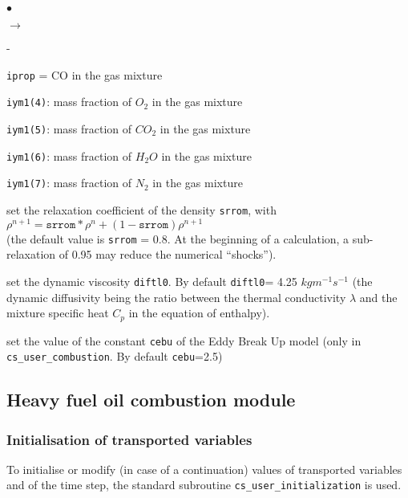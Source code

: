 {{{\begin{list}{$\bullet$}{}
\begin{list}{$\rightarrow$}{}
\begin{list}{}{}
\begin{list}{-}{}
\begin{list}{\texttt{iprop} = }{}
                            CO in the gas mixture
                      \item \texttt{iym1(4)}: mass fraction of
                            $O_2$ in the gas mixture
                      \item \texttt{iym1(5)}: mass fraction of
                            $CO_2$ in the gas mixture
                      \item \texttt{iym1(6)}: mass fraction of
                            $H_2O$ in the gas mixture
                      \item \texttt{iym1(7)}: mass fraction of
                            $N_2$ in the gas mixture
                     \end{list}
              \end{list}
             \end{list}
      \end{list}

 \item set the relaxation coefficient of the density \texttt{srrom}, with \\
$\rho^{n+1}=\texttt{srrom}*\rho^{n}+(1-\texttt{srrom})\rho^{n+1}$\\
(the default value is \texttt{srrom} = 0.8. At the
      beginning of a calculation, a sub-relaxation of 0.95 may reduce
      the numerical ``shocks'').

 \item set the dynamic viscosity \texttt{diftl0}. By default
      \texttt{diftl0}= 4.25 $kgm^{-1}s^{-1}$
(the dynamic diffusivity being the ratio between the thermal
      conductivity $\lambda$ and the mixture specific heat $C_p$ in the
      equation of enthalpy).

 \item set the value of the constant \texttt{cebu} of the Eddy Break
      Up model (only in \texttt{cs\_user\_combustion}. By default \texttt{cebu}=2.5)
\end{list}

\subsection{Heavy fuel oil combustion module}
\subsubsection{Initialisation of transported variables}
To initialise or modify (in case of a continuation) values of transported
variables and of the time step, the standard subroutine \texttt{cs\_user\_initialization} is used.

}}}
